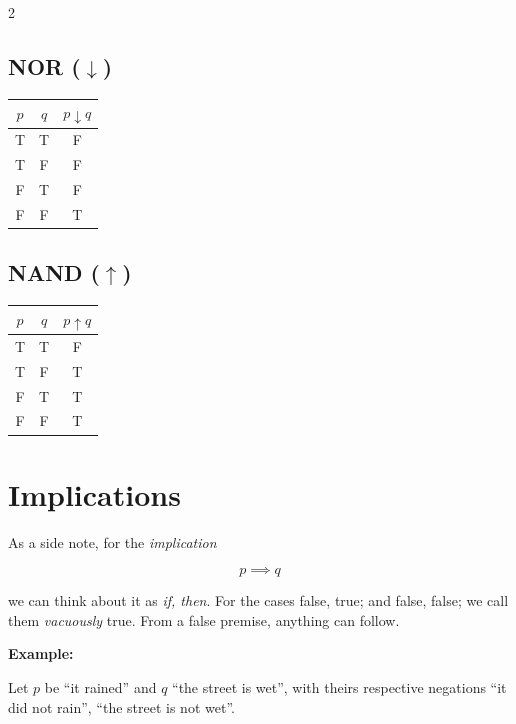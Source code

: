 \begin{multicols}{2}
	\subsection*{NOR (\(\downarrow\))}

	\begin{tabular}{|c|c|c|}
		\toprule
		\(p\) & \(q\) & \(p \downarrow q\) \\
		\midrule
		T     & T     & F                  \\
		T     & F     & F                  \\
		F     & T     & F                  \\
		F     & F     & T                  \\
		\bottomrule
	\end{tabular}

	\vspace{1em}

	\subsection*{NAND (\(\uparrow\))}

	\begin{tabular}{|c|c|c|}
		\toprule
		\(p\) & \(q\) & \(p \uparrow q\) \\
		\midrule
		T     & T     & F                \\
		T     & F     & T                \\
		F     & T     & T                \\
		F     & F     & T                \\
		\bottomrule
	\end{tabular}

\end{multicols}
\medskip

\section{Implications}

As a side note, for the \emph{implication}

\[
	p \implies q
\]

we can think about it as \emph{if, then}. For the cases  false, true; and false, false; we call them \emph{vacuously} true.
From a false premise, anything can follow.

\textbf{Example:}

Let \(p\) be ``it rained'' and \(q\) ``the street is wet'', with theirs respective negations ``it did not rain'', ``the street is not wet''.

